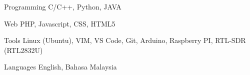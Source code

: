

\begin{cvskills}

  \cvskill
    {Programming} %
    {C/C++, Python, JAVA} %

  \cvskill
    {Web} %
    {PHP, Javascript, CSS, HTML5} %

  \cvskill
    {Tools} %
    {Linux (Ubuntu), VIM, VS Code, Git, Arduino, Raspberry PI, RTL-SDR (RTL2832U)} %

  \cvskill
    {Languages} %
    {English, Bahasa Malaysia} %

\end{cvskills}
